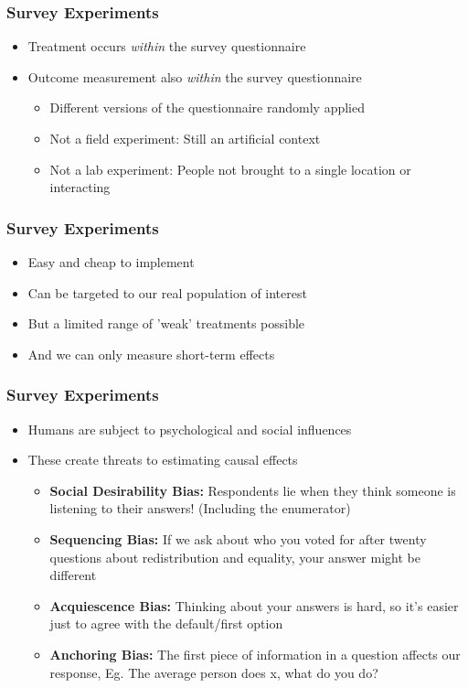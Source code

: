 \documentclass[xcolor=x11names,compress]{beamer}\usepackage[]{graphicx}\usepackage[]{color}
\renewcommand{\(}{\begin{columns}}
\renewcommand{\)}{\end{columns}}
\newcommand{\<}[1]{\begin{column}{#1}}
\renewcommand{\>}{\end{column}}
\begin{document}
\begin{frame}
\frametitle{Survey Experiments}
\begin{itemize}
\item Treatment occurs \textit{within} the survey questionnaire
\pause
\item Outcome measurement also \textit{within} the survey questionnaire
\pause
\begin{itemize}
\item Different versions of the questionnaire randomly applied
\pause
\item Not a field experiment: Still an artificial context
\pause
\item Not a lab experiment: People not brought to a single location or interacting
\end{itemize}
\end{itemize}
\end{frame}

\begin{frame}
\frametitle{Survey Experiments}
\begin{itemize}
\item Easy and cheap to implement
\pause
\item Can be targeted to our real population of interest
\pause
\item But a limited range of 'weak' treatments possible
\pause
\item And we can only measure short-term effects
\end{itemize}
\end{frame}

\begin{frame}
\frametitle{Survey Experiments}
\begin{itemize}
\item Humans are subject to psychological and social influences
\pause
\item These create threats to estimating causal effects
\pause
\begin{itemize}
\item \textbf{Social Desirability Bias:} Respondents lie when they think someone is listening to their answers! (Including the enumerator)
\pause
\item \textbf{Sequencing Bias:} If we ask about who you voted for after twenty questions about redistribution and equality, your answer might be different
\pause
\item \textbf{Acquiescence Bias:} Thinking about your answers is hard, so it's easier just to agree with the default/first option
\pause
\item \textbf{Anchoring Bias:} The first piece of information in a question affects our response, Eg. The average person does x, what do you do?
\end{itemize}
\end{itemize}
\end{frame}
\end{document}
